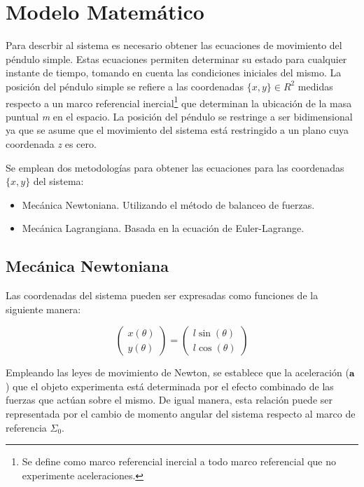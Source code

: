 \section{Modelo Matemático}

Para descrbir al sistema es necesario obtener las ecuaciones 
de movimiento del péndulo simple. 
Estas ecuaciones permiten 
determinar su estado para cualquier 
instante de tiempo, tomando en cuenta las condiciones 
iniciales del mismo. 
La posición del péndulo simple se refiere a 
las coordenadas  $\{x, y\} \in R^2$  medidas respecto a un marco 
referencial inercial\footnote{Se define como marco 
referencial inercial a todo marco referencial que no 
experimente aceleraciones.} 
que determinan la ubicación de 
la masa puntual \emph{m} en el espacio.
La posición del péndulo se restringe a ser bidimensional
ya que se asume que el movimiento del sistema está restringido a un plano
cuya coordenada \emph{z} es cero.

Se emplean dos metodologías para obtener las ecuaciones para las coordenadas 
$\{x, y\}$ del sistema:
\begin{itemize}
 \item Mecánica Newtoniana. Utilizando el método de balanceo de fuerzas.
 \item Mecánica Lagrangiana. Basada en la ecuación de Euler-Lagrange.
\end{itemize}




\subsection{Mecánica Newtoniana}

Las coordenadas del sistema pueden ser expresadas como funciones
de la siguiente manera:

\begin{equation}
 \begin{pmatrix}
 x(\theta)\\
 y(\theta)
 \end{pmatrix}
 = \begin{pmatrix}
 l \sin (\theta)\\
 l \cos (\theta)
 \end{pmatrix}
 \label{eq: system coordinates}
\end{equation}

Empleando las leyes de movimiento de Newton, 
se establece que la aceleración ($\bold{a}$) que el objeto
experimenta está determinada por el
efecto combinado de las fuerzas que actúan sobre el mismo.
De igual manera, esta relación puede ser representada por
el cambio de momento angular del sistema respecto al 
marco de referencia $\Sigma_0$.

